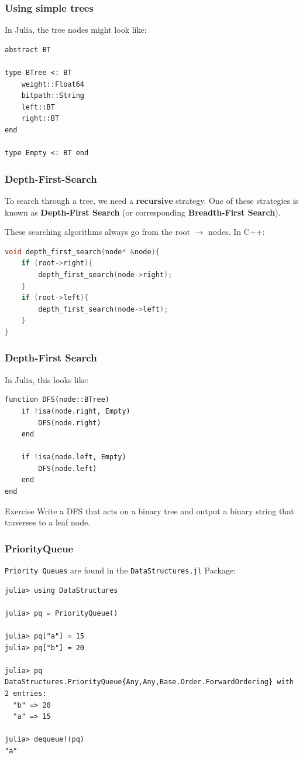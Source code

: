 \documentclass{beamer}
\begin{document}
\begin{frame}[fragile]
\frametitle{Using simple trees}
In Julia, the tree nodes might look like:
\begin{lstlisting}
abstract BT 

type BTree <: BT
    weight::Float64
    bitpath::String
    left::BT
    right::BT
end

type Empty <: BT end

\end{lstlisting}
\end{frame}

\begin{frame}[fragile]
\frametitle{Depth-First-Search}
To search through a tree, we need a \textbf{recursive} strategy. One of these strategies is known as \textbf{Depth-First Search} (or corresponding \textbf{Breadth-First Search}). 

\vspace{0.5cm}
These searching algorithms always go from the root $\rightarrow$ nodes. In C++:
\begin{lstlisting}[language=c++]
void depth_first_search(node* &node){
    if (root->right){
        depth_first_search(node->right);
    }
    if (root->left){
        depth_first_search(node->left);
    }
}
\end{lstlisting}
\end{frame}

\begin{frame}[fragile]
\frametitle{Depth-First Search}
In Julia, this looks like:
\begin{lstlisting}
function DFS(node::BTree)
    if !isa(node.right, Empty)
        DFS(node.right)
    end
    
    if !isa(node.left, Empty)
        DFS(node.left)
    end
end

\end{lstlisting}
\begin{block}{Exercise}
Write a DFS that acts on a binary tree and output a binary string that traverses to a leaf node.
\end{block}
\end{frame}

\begin{frame}[fragile]
\frametitle{PriorityQueue}
\texttt{Priority Queues} are found in the \texttt{DataStructures.jl} Package:
\begin{lstlisting}
julia> using DataStructures

julia> pq = PriorityQueue()

julia> pq["a"] = 15
julia> pq["b"] = 20

julia> pq
DataStructures.PriorityQueue{Any,Any,Base.Order.ForwardOrdering} with 2 entries:
  "b" => 20
  "a" => 15

julia> dequeue!(pq)
"a"
\end{lstlisting}
\end{frame}
\end{document}
